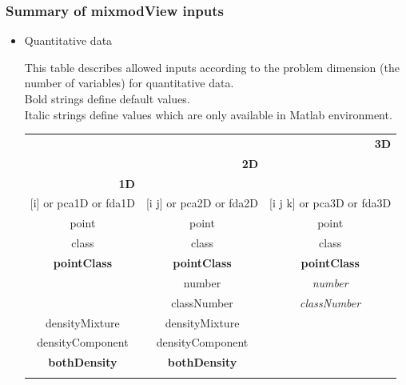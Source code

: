 \subsubsection{Summary of mixmodView inputs}
 \label{array_mixmodView}
\begin{itemize}
\item Quantitative data

This table describes allowed inputs according to the problem dimension (the number of variables) for quantitative data.\\
Bold strings define default values.\\
Italic strings define values which are only available in Matlab environment.\\







\begin{tabular}{|c|c|c|}
 \hline

 \multicolumn{3}{|r|}{{\bf 3D}} \\

 \cline{1-2}

 \multicolumn{2}{|r|}{{\bf 2D}}& \\

 \cline{1-1}

 \multicolumn{1}{|r|}{{\bf 1D}}& &\\

 \hdashline

 [i] or pca1D or fda1D & [i j] or pca2D or fda2D & [i j k] or pca3D or fda3D \\

\hdashline

point &  point &  point \\
class & class & class \\
{\bf pointClass} & {\bf pointClass} & {\bf pointClass} \\
 & number & {\it number}\\
 & classNumber & {\it classNumber}\\

 \hdashline

 densityMixture &  densityMixture & \\
densityComponent & densityComponent & \\
{\bf bothDensity} & {\bf bothDensity} & \\

\hdashline


\end{tabular}
\end{itemize}
